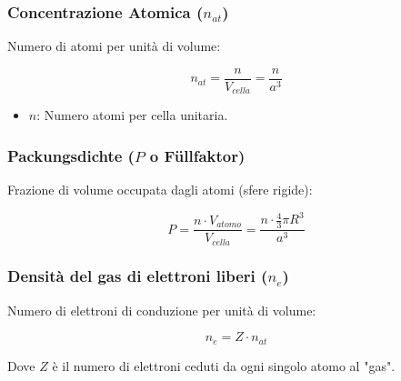 \subsubsection{Concentrazione Atomica ($n_{at}$)}

Numero di atomi per unità di volume:

\begin{minipage}{0.4\columnwidth}
	$$n_{at} = \frac{n}{V_{cella}} = \frac{n}{a^3}$$
\end{minipage}
\begin{minipage}{0.6\columnwidth}
	\begin{itemize}
		\item $n$: Numero atomi per cella unitaria.
	\end{itemize}
\end{minipage}

\subsubsection{Packungsdichte ($P$ o Füllfaktor)}

Frazione di volume occupata dagli atomi (sfere rigide):

$$P = \frac{n \cdot V_{atomo}}{V_{cella}} = \frac{n \cdot \frac{4}{3}\pi R^3}{a^3}$$


\subsubsection{Densità del gas di elettroni liberi ($n_e$)}
Numero di elettroni di conduzione per unità di volume:

$$n_e = Z \cdot n_{at}$$

Dove $Z$ è il numero di elettroni ceduti da ogni singolo atomo al "gas".

